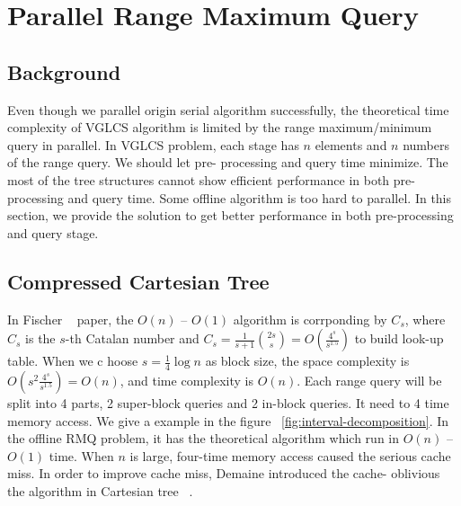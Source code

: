 \section{Parallel Range Maximum Query}
\label{sec:parallelRMQ}

\subsection{Background}

Even though we parallel origin serial algorithm successfully, the
theoretical time complexity of VGLCS algorithm is limited by the range
maximum/minimum query in parallel.  In VGLCS problem, each stage has
$n$ elements and $n$ numbers of the range query.  We should let pre-
processing and query time minimize.  The most of the tree structures
cannot show efficient performance in both pre-processing and query
time.  Some offline algorithm is too hard to parallel.  In this
section, we provide the solution to get better performance in both
pre-processing and query stage.

\iffalse
縱使我們已能很好地平行化原本的序列算法，在理論複雜度上受限於平行下的區間極值查詢 (Range Minimum/Maximum Query, RMQ)。
在這個應用中，每一階段有 $n$ 個元素和 $n$ 個區間詢問。
這樣的條件下，大部分樹狀結構難以在前處理過程和每次詢問皆達到最好效能。
對於 $O(n)$ -- $O(1)$ 操作的離線區間詢問無法提供平行。
再接續的小節中，我們將提出在兼顧建表、插入和查找的數據結構與算法。
\fi

\subsection{Compressed Cartesian Tree}

In Fischer ~\cite{Fischer2006TheoreticalAP} paper, the $O(n)$ --
$O(1)$ algorithm is corrponding by $C_s$, where $C_s$ is the $s$-th
Catalan number  and $C_s = \frac{1}{s+1}\binom{2s}{s} =
O(\frac{4^s}{s^{1.5}})$ to build look-up table.  When we c hoose $s =
\frac{1}{4} \log n$ as block size, the space complexity is $O(s^2
\frac{4^s}{s^{1.5}}) = O(n)$, and time complexity is $O(n)$.  Each
range query will be split into 4 parts, 2 super-block queries and 2
in-block queries.  It need to 4 time memory access.  We give a example
in the figure ~\ref{fig:interval-decomposition}.  In the offline RMQ
problem, it has the theoretical algorithm which run in $O(n)$ --
$O(1)$ time.  When $n$ is large, four-time memory access caused the
serious cache miss. In order to improve cache miss, Demaine introduced
the cache- oblivious the algorithm in Cartesian tree
~\cite{Demaine2009OnCT}.

